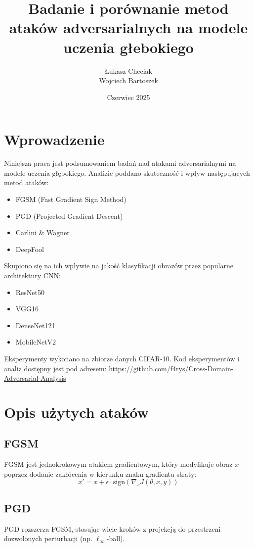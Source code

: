 \documentclass{article}
\title{Badanie i porównanie metod ataków adversarialnych na modele uczenia głebokiego}
\author{\L{}ukasz Checiak \\ Wojciech Bartoszek}
\date{Czerwiec 2025}
\begin{document}
\maketitle

\section{Wprowadzenie}
Niniejsza praca jest podsumowaniem badań nad atakami adversarialnymi na modele uczenia głębokiego. Analizie poddano skuteczność i wpływ następujących metod ataków:
\begin{itemize}
    \item FGSM (Fast Gradient Sign Method)
    \item PGD (Projected Gradient Descent)
    \item Carlini \& Wagner
    \item DeepFool
\end{itemize}

Skupiono się na ich wpływie na jakość klasyfikacji obrazów przez popularne architektury CNN:
\begin{itemize}
    \item ResNet50
    \item VGG16
    \item DenseNet121
    \item MobileNetV2
\end{itemize}

Eksperymenty wykonano na zbiorze danych CIFAR-10. Kod eksperymentów i analiz dostępny jest pod adresem: \url{https://github.com/f4rys/Cross-Domain-Adversarial-Analysis}

\section{Opis użytych ataków}
\subsection{FGSM}
FGSM \cite{goodfellow2014explaining} jest jednokrokowym atakiem gradientowym, który modyfikuje obraz $x$ poprzez dodanie zakłócenia w kierunku znaku gradientu straty:
\begin{equation}
    x' = x + \epsilon \cdot \text{sign}(\nabla_x J(\theta, x, y))
\end{equation}

\subsection{PGD}
PGD \cite{madry2017towards} rozszerza FGSM, stosując wiele kroków z projekcją do przestrzeni dozwolonych perturbacji (np. $\ell_\infty$-ball).
\end{document}
